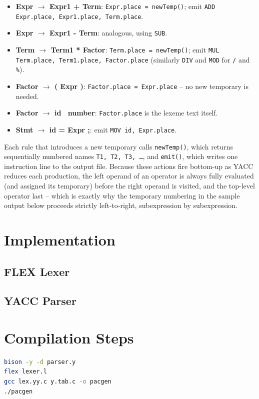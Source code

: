 \documentclass{article}
\begin{document}
\begin{itemize}
    \item \textbf{Expr $\rightarrow$ Expr1 + Term}: \texttt{Expr.place = newTemp()}; emit \texttt{ADD Expr.place, Expr1.place, Term.place}.
    \item \textbf{Expr $\rightarrow$ Expr1 - Term}: analogous, using \texttt{SUB}.
    \item \textbf{Term $\rightarrow$ Term1 * Factor}: \texttt{Term.place = newTemp()}; emit \texttt{MUL Term.place, Term1.place, Factor.place} (similarly \texttt{DIV} and \texttt{MOD} for \texttt{/} and \texttt{\%}).
    \item \textbf{Factor $\rightarrow$ ( Expr )}: \texttt{Factor.place = Expr.place} -- no new temporary is needed.
    \item \textbf{Factor $\rightarrow$ id \textbar\ number}: \texttt{Factor.place} is the lexeme text itself.
    \item \textbf{Stmt $\rightarrow$ id = Expr ;}: emit \texttt{MOV id, Expr.place}.
\end{itemize}

Each rule that introduces a new temporary calls \texttt{newTemp()}, which returns sequentially numbered names \texttt{T1, T2, T3, \ldots}, and \texttt{emit()}, which writes one instruction line to the output file. Because these actions fire bottom-up as YACC reduces each production, the left operand of an operator is always fully evaluated (and assigned its temporary) before the right operand is visited, and the top-level operator last -- which is exactly why the temporary numbering in the sample output below proceeds strictly left-to-right, subexpression by subexpression.

\section{Implementation}

\subsection{FLEX Lexer}


\subsection{YACC Parser}


\section{Compilation Steps}
\begin{lstlisting}[language=bash, caption=Build and Run]
bison -y -d parser.y
flex lexer.l
gcc lex.yy.c y.tab.c -o pacgen
./pacgen
\end{lstlisting}
\end{document}

